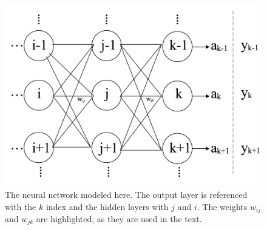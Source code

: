 \documentclass[12pt]{article}
\begin{document}
\begin{figure}[h]
\begin{center}
\includegraphics[scale=0.2]{Figs/nn_fig.png}
\caption{The neural network modeled here. The output layer is referenced with the $k$ index and the hidden layers with $j$ and $i$. The weights $w_{ij}$ and $w_{jk}$ are highlighted, as they are used in the text.}
\label{nn}
\end{center}
\end{figure}
\end{document}
